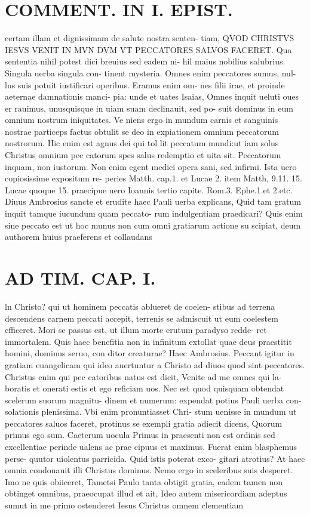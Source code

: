 \documentclass{article}
\begin{document}
\begin{pages}
\section*{COMMENT. IN I. EPIST. }\pstart certam illam et dignissimam de salute nostra senten- tiam, QVOD CHRISTVS IESVS VENIT IN MVN DVM VT PECCATORES SALVOS FACERET. Qua sententia nihil potest dici breuius sed eadem ni- hil maius nobilius salubrius. Singula uerba singula con- tinent mysteria. Omnes enim peccatores sumus, nul- lus suis potuit iustificari operibus. Eramus enim om- nes filii irae, et proinde aeternae damnationis manci- pia: unde et uates Isaias, Omnes inquit ueluti oues er rauimus, unusquisque in uiam suam declinauit, sed po- suit dominus in eum omnium nostrum iniquitates. Ve niens ergo in mundum carnis et sanguinis nostrae particeps factus obtulit se deo in expiationem omnium peccatorum nostrorum. Hic enim est agnus dei qui tol lit peccatum mundi:ut iam solus Christus omnium pec catorum spes salus redemptio et uita sit. Peccatorum inquam, non iustorum. Non enim egent medici opera sani, sed infirmi. Ista uero copiosissime expositum re- peries Matth. cap.1. et Lucae 2. item Matth, 9.11. 15. Lucae quoque 15. praecipue uero Ioannis tertio capite. Rom.3. Ephe.1.et 2.etc. Diuus Ambrosius sancte et erudite haec Pauli uerba explicans, Quid tam gratum inquit tamque iucundum quam peccato- rum indulgentiam praedicari? Quis enim sine peccato est ut hoc munus non cum omni gratiarum actione su scipiat, deum authorem huius praeferens et collaudans  \pend
\section*{AD TIM. CAP. I. }
\marginpar{[ p.105 ]}\pstart ln Christo? qui ut hominem peccatis ablueret de coelen- stibus ad terrena descendens carnem peccati accepit, terrenis se admiscuit ut eum coelestem efficeret. Mori se passus est, ut illum morte erutum paradyso redde- ret immortalem. Quis haec benefitia non in infinitum extollat quae deus praestitit homini, dominus seruo, con ditor creaturae? Haec Ambrosius. Peccant igitur in gratiam euangelicam qui ideo auertuntur a Christo ad diuos quod sint peccatores. Christus enim qui pec catoribus natus est dicit, Venite ad me omnes qui la- boratis et onerati estis et ego reficiam uos. Nec est quod quisquam obtendat scelerum suorum magnitu- dinem et numerum: expendat potius Pauli uerba con- solationis plenissima. Vbi enim pronuntiasset Chri- stum uenisse in mundum ut peccatores saluos faceret, protinus se exempli gratia adiecit dicens, Quorum primus ego sum. Caeterum uocula Primus in praesenti non est ordinis sed excellentiae perinde ualens ac prae cipuus et maximus. Fuerat enim blasphemus perse- quutor uiolentus parricida. Quid istis poterat exco- gitari atrotius? At haec omnia condonauit illi Christus dominus. Nemo ergo in sceleribus suis desperet. Imo ne quis obiiceret, Tametsi Paulo tanta obtigit gratia, eadem tamen non obtinget omnibus, praeocupat illud et ait, Ideo autem misericordiam adeptus sumut in me primo ostenderet Iesus Christus omnem clementiam  \pend

\end{pages}
\end{document}
